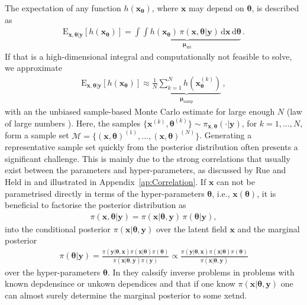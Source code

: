 The expectation of any function $h(\bm{x}_{\bm{\theta}})$, where $\bm{x}$ may depend on $\bm{\theta}$, is described as 
\begin{align}
	\text{E}_{\bm{x},\bm{\theta}|\bm{y}} [h(\bm{x}_{\bm{\theta}})] =  \underbrace{\int \int   h(\bm{x}_{\bm{\theta}}) \,  \pi(\bm{x}, \bm{\theta} | \bm{y} ) \, \text{d} \bm{x}  \, \text{d} \bm{\theta}}_{\bm{\mu}_{\text{int}}}   \label{eq:expPos} \, .
\end{align}
If that is a high-dimensional integral and computationally not feasible to solve, we approximate 
\begin{align}
	\label{eq:sampMean}
	\text{E}_{\bm{x},\bm{\theta}|\bm{y}} [h(\bm{x}_{\bm{\theta}})] \approx \underbrace{ \frac{1}{N} \sum_{k=1}^{N} h(\bm{x}^{(k)}_{\bm{\theta}})  }_{\bm{\mu}_{\text{samp}}} \, ,
\end{align}
with an the unbiased sample-based Monte Carlo estimate \cite{roberts2004general} for large enough $N$ (law of large numbers \cite[Chapter 17]{tweedie2009measprob}).
Here, the samples $\{\bm{x}^{(k)},\bm{\theta}^{(k)} \}\sim \pi_{\bm{x}, \bm{\theta}}(\cdot|\bm{y})$, for $k = 1, \dots, N$, form a sample set $\mathcal{M} =\{ (\bm{x},\bm{\theta})^{(1)}, \dots ,  (\bm{x},\bm{\theta})^{(N)} \}$.
Generating a representative sample set quickly from the posterior distribution often presents a significant challenge. This is mainly due to the strong correlations that usually exist between the parameters and hyper-parameters, as discussed by Rue and Held in \cite{rue2005gaussian} and illustrated in Appendix~\ref{ap:Correlation}.
If $\bm{x}$ can not be parametrised directly in terms of the hyper-parameters $\bm{\theta}$, i.e., $\bm{x}(\bm{\theta})$, it is beneficial to factorise the posterior distribution as
\begin{align}
	\pi(\bm{x}, \bm{\theta} |  \bm{y}) = \pi(\bm{x} |  \bm{\theta}, \bm{y}) \, \pi(\bm{\theta} |   \bm{y}), \label{eq:MTC}
\end{align}
into the conditional posterior $\pi(\bm{x} |  \bm{\theta}, \bm{y})$ over the latent field $\bm{x}$ and the marginal posterior 
\begin{align}
	\pi(\bm{\theta} |   \bm{y}) =  \frac{ \pi(   \bm{y} | \bm{\theta} ,\bm{x})  \pi( \bm{x} | \bm{\theta} )  \pi(\bm{\theta}) }{ \pi(\bm{x} | \bm{\theta} ,   \bm{y})   \pi( \bm{y})} \propto \frac{ \pi(   \bm{y} | \bm{\theta} ,\bm{x})  \pi( \bm{x} | \bm{\theta} )  \pi(\bm{\theta}) }{ \pi(\bm{x} | \bm{\theta} ,   \bm{y}) } \label{eq:margGen}
\end{align}
over the hyper-parameters $\bm{\theta}$.
In \cite{} they calssify inverse problems in problems with known depdensince or unkown dependices and that if one know $\pi(\bm{x} | \bm{\theta} ,   \bm{y})$ one can almost surely determine the marginal posterior to some xetnd.

